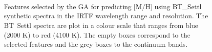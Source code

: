 % 
\begin{figure}
 \captionsetup[subfloat]{farskip=2pt,captionskip=-18pt}
 \vspace*{-10pt}
 \\[-9ex]

 \\[-9ex]

 \\[-7ex]

 \caption{Features selected by the GA for predicting [M/H] using
    BT\_Settl synthetic spectra in the IRTF wavelength range
    and resolution. The BT\ Settl spectra are plot in a colour scale
    that ranges from blue (2000 K) to red (4100 K). The empty boxes
    correspond to the selected features and the grey boxes to the
    continuum bands.}
 \label{fig:IRTF-met}
\end {figure}



